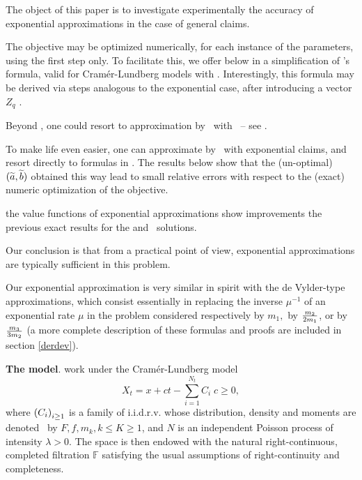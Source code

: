 The object of this paper is to investigate experimentally
the accuracy of exponential approximations in the case of general claims.


 \beR  The objective may be optimized numerically, for each instance of the parameters,  using the first step only. To facilitate this,  we offer below in  a simplification of \cite{Gaj}'s formula, valid for  Cramér-Lundberg models  with \me. Interestingly, this formula may be derived via steps analogous to the exponential case, after introducing a vector $Z_q$ \sf.

 Beyond \me, one could resort to approximation by \procs\ with \me\ -- see \fe \cite{AA}.


To make life even easier, one can  approximate by  \procs\ with exponential claims, and resort directly  to  formulas  in \cite{AGLW}.  The results below  show that the  (un-optimal)  $(\widetilde a, \widetilde b)$ obtained this way lead to small relative errors with respect to the (exact) numeric optimization of  the objective.

  \Ito  the value functions of exponential approximations show   improvements  \wrt  the previous exact results for the \deF and \SLG\ solutions.

  Our  conclusion is that from a practical point of view, exponential approximations are typically sufficient in  this problem.

\eeR

 Our exponential approximation is very similar in spirit with the de Vylder-type approximations, which consist essentially in
replacing the inverse $\mu^{-1}$ of an exponential rate $\mu$ in the problem considered  respectively    by $m_1, $  by $\frac {m_2}{2 m_1}$, or by $\frac {m_3}{3 m_2}$ (a more complete description of these formulas and proofs are included in section \ref{derdev}).



{\bf The model}. \cite{AGLW} work under the %
Cramér-Lundberg model
\begin{equation}
\label{CLp}
X_t=x+c t-\sum_{i=1}^{N_t}C_i \; %
c \geq 0, %
\end{equation}
where $\left(C_i\right)_{i\geq 1}$ is a family of i.i.d.r.v.  whose distribution, density and   moments are denoted \resp\ by $F,f,m_k, k \leq K \geq 1$,   and  $N$ is an independent Poisson process  of intensity $\lambda>0$. %
The space is then endowed with the natural right-continuous, completed filtration
 $\mathbb{F}$  satisfying the usual assumptions of right-continuity and completeness.


